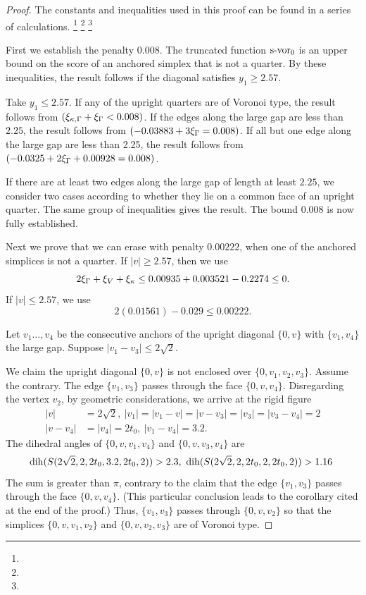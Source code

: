 \begin{proof}
The constants and inequalities used in this proof can be found in
a series of calculations.%
\footnote{} %
\footnote{} %
\footnote{} %


First we establish the penalty $0.008$. The truncated function
$\operatorname{s-vor}_0$ is an upper bound on the score of an anchored simplex
that is not a quarter.  By these inequalities, the result follows
if the diagonal satisfies $y_1\ge 2.57$.

Take $y_1\le 2.57$. If any of the upright quarters are of Voronoi
type, the result follows from $(\xi_{\kappa,\Gamma}+\xi_\Gamma<0.008)$. If the edges
along the large gap are less than $2.25$, the result follows from
$(-0.03883+3\xi_\Gamma = 0.008)$. If all but one edge along the large
gap are  less than 2.25, the result follows from $(-0.0325 + 2\xi_\Gamma
+ 0.00928 = 0.008)$.

If there are at least two edges along the large gap of length at
least $2.25$, we consider two cases according to whether they lie
on a common face of an upright quarter.  The same group of
inequalities gives the result. The bound $0.008$ is now fully
established.

\smallskip
Next we prove that we can erase with penalty $0.00222$, when one
of the anchored simplices is not a quarter.  If $|v|\ge2.57$, then
we use
    $$2\xi_\Gamma + \xi_V + \xi_\kappa \le 0.00935+0.003521 -0.2274\le 0.$$
If $|v|\le2.57$, we use
    $$2(0.01561)-0.029 \le 0.00222.$$

\smallskip
Let $v_1\ldots,v_4$ be the consecutive anchors of
the upright diagonal $\{0,v\}$ with $\{v_1,v_4\}$ the large gap.
Suppose $|v_1-v_3|\le 2\sqrt{2}$.

We claim the upright diagonal $\{0,v\}$ is not enclosed over
$\{0,v_1,v_2,v_3\}$. Assume the contrary.  The edge $\{v_1,v_3\}$ passes
through the face $\{0,v,v_4\}$.  Disregarding the vertex $v_2$, by
geometric considerations, we arrive at the rigid figure
    $$
    \begin{array}{lll}
    |v|&=2\sqrt{2},\ |v_1|=|v_1-v|=|v-v_3|=|v_3|=|v_3-v_4|=2
    \\ |v-v_4|&=|v_4|=2t_0,\ |v_1-v_4|=3.2.
    \end{array}
    $$
The dihedral angles of $\{0,v,v_1,v_4\}$ and $\{0,v,v_3,v_4\}$ are
    $$\operatorname{dih}(S(2\sqrt{2},2,2t_0,3.2,2t_0,2))>2.3,\
    \operatorname{dih}(S(2\sqrt{2},2,2t_0,2,2t_0,2))>1.16\
    $$
The sum is greater than $\pi$, contrary to the claim that the edge
$\{v_1,v_3\}$ passes through the face $\{0,v,v_4\}$.
(This particular conclusion leads to the corollary cited at the
end of the proof.)
Thus, $\{v_1,v_3\}$ passes through $\{0,v,v_2\}$ so that the
simplices $\{0,v,v_1,v_2\}$
and $\{0,v,v_2,v_3\}$ are of Voronoi type.


\end{proof}
